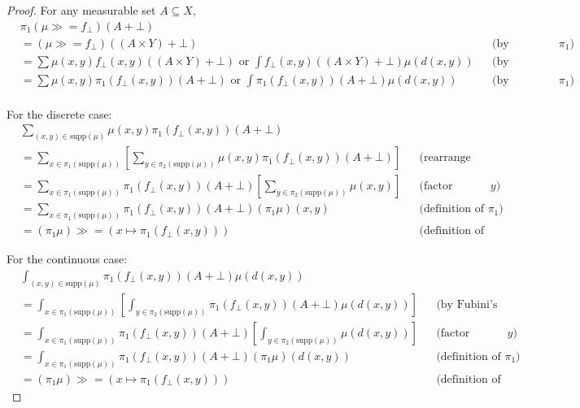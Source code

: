 \begin{proof}
	For any measurable set $A \subseteq X$,
	\begin{align*}
		&\pi_1(\mu \gg\!= f_{\bot})(A + \bot) \\
		&= (\mu \gg\!= f_{\bot})((A \times Y) + \bot) && \text{(by definition of $\pi_1$)} \\
		&= \sum \mu(x,y) f_{\bot}(x,y)((A \times Y) + \bot) \text{ or } \int f_{\bot}(x,y)((A \times Y) + \bot) \mu(d(x,y)) && \text{(by definition of bind)} \\
		&= \sum \mu(x,y) \pi_1(f_{\bot}(x,y))(A + \bot) \text{ or } \int \pi_1(f_{\bot}(x,y))(A + \bot) \mu(d(x,y)) && \text{(by definition of $\pi_1$)} \\
	\end{align*}
	
	For the discrete case:
	\begin{align*}
		&\sum_{(x,y) \in \text{supp}(\mu)} \mu(x,y) \pi_1(f_{\bot}(x,y))(A + \bot) \\
		&= \sum_{x \in \pi_1(\text{supp}(\mu))} \left[ \sum_{y \in \pi_2(\text{supp}(\mu))} \mu(x,y) \pi_1(f_{\bot}(x,y))(A + \bot) \right] && \text{(rearrange sum)} \\
		&= \sum_{x \in \pi_1(\text{supp}(\mu))} \pi_1(f_{\bot}(x,y))(A + \bot) \left[ \sum_{y \in \pi_2(\text{supp}(\mu))} \mu(x,y) \right] && \text{(factor constant in $y$)} \\
		&= \sum_{x \in \pi_1(\text{supp}(\mu))} \pi_1(f_{\bot}(x,y))(A + \bot) (\pi_1 \mu)(x,y) && \text{(definition of $\pi_1$)} \\
		&= (\pi_1 \mu) \gg\!= (x \mapsto \pi_1(f_{\bot}(x,y))) && \text{(definition of bind)}
	\end{align*}

	For the continuous case: 
	\begin{align*}
		&\int_{(x,y) \in \text{supp}(\mu)} \pi_1(f_{\bot}(x,y))(A + \bot) \mu(d(x,y)) \\
		&= \int_{x \in \pi_1(\text{supp}(\mu))} \left[ \int_{y \in \pi_2(\text{supp}(\mu))} \pi_1(f_{\bot}(x,y))(A + \bot) \mu(d(x,y)) \right] && \text{(by Fubini's theorem)} \\
		&= \int_{x \in \pi_1(\text{supp}(\mu))} \pi_1(f_{\bot}(x,y))(A + \bot) \left[ \int_{y \in \pi_2(\text{supp}(\mu))} \mu(d(x,y)) \right] && \text{(factor constant in $y$)} \\
		&= \int_{x \in \pi_1(\text{supp}(\mu))} \pi_1(f_{\bot}(x,y))(A + \bot) (\pi_1 \mu)(d(x,y)) && \text{(definition of $\pi_1$)} \\
		&= (\pi_1 \mu) \gg\!= (x \mapsto \pi_1(f_{\bot}(x,y))) && \text{(definition of bind)}
	\end{align*}
\end{proof}

